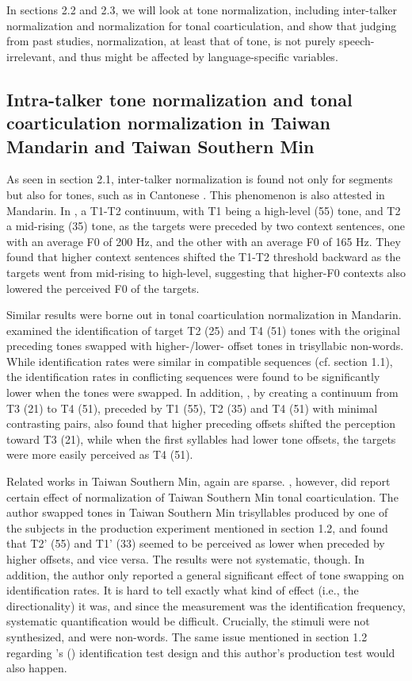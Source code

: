 \documentclass[12pt]{report}
\begin{document}
\begin{CJK}{UTF8}{bsmi}
In sections 2.2 and 2.3, we will look at tone normalization, including inter-talker normalization and normalization for tonal coarticulation, and show that judging from past studies, normalization, at least that of tone, is not purely speech-irrelevant, and thus might be affected by language-specific variables.

\subsection{Intra-talker tone normalization and tonal coarticulation normalization in Taiwan Mandarin and Taiwan Southern Min}

As seen in section 2.1, inter-talker normalization is found not only for segments but also for tones, such as in Cantonese \citep{WongDiehl2003}. This phenomenon is also attested in Mandarin. In \cite{HuangHolt2009}, a T1-T2 continuum, with T1 being a high-level (55) tone, and T2 a mid-rising (35) tone, as the targets were preceded by two context sentences, one with an average F0 of 200 Hz, and the other with an average F0 of 165 Hz. They found that higher context sentences shifted the T1-T2 threshold backward as the targets went from mid-rising to high-level, suggesting that higher-F0 contexts also lowered the perceived F0 of the targets. 

Similar results were borne out in tonal coarticulation normalization in Mandarin. \cite{Xu1994} examined the identification of target T2 (25) and T4 (51) tones with the original preceding tones swapped with higher-/lower- offset tones in trisyllabic non-words. While identification rates were similar in compatible sequences (cf. section 1.1), the identification rates in conflicting sequences were found to be significantly lower when the tones were swapped. In addition, \cite{Zhangetal2022}, by creating a continuum from T3 (21) to T4 (51), preceded by T1 (55), T2 (35) and T4 (51) with minimal contrasting pairs, also found that higher preceding offsets shifted the perception toward T3 (21), while when the first syllables had lower tone offsets, the targets were more easily perceived as T4 (51).

Related works in Taiwan Southern Min, again are sparse. \cite{Wang2002}, however, did report certain effect of normalization of Taiwan Southern Min tonal coarticulation. The author swapped tones in Taiwan Southern Min trisyllables produced by one of the subjects in the production experiment mentioned in section 1.2, and found that T2' (55) and T1' (33) seemed to be perceived as lower when preceded by higher offsets, and vice versa. The results were not systematic, though. In addition, the author only reported a general significant effect of tone swapping on identification rates. It is hard to tell exactly what kind of effect (i.e., the directionality) it was, and since the measurement was the identification frequency, systematic quantification would be difficult. Crucially, the stimuli were not synthesized, and were non-words. The same issue mentioned in section 1.2 regarding \citeauthor{Peng1997}'s (\citeyear{Peng1997}) identification test design and this author's production test would also happen.


\end{CJK}
\end{document}
